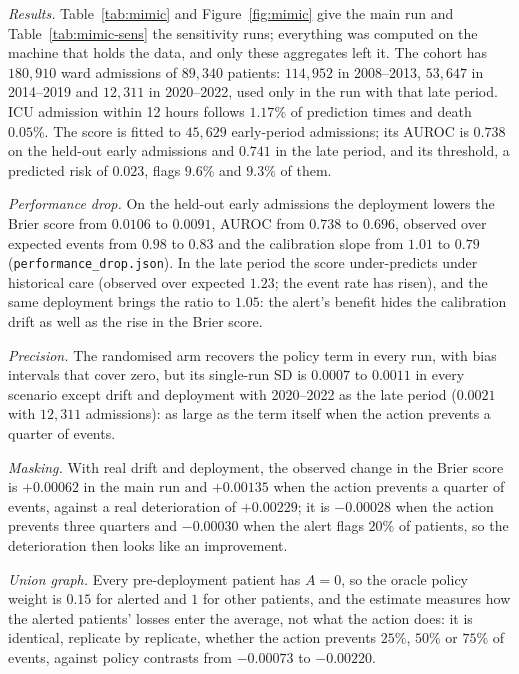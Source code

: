 \documentclass[letterpaper]{article} %
\begin{document}
\emph{Results.} Table~\ref{tab:mimic} and Figure~\ref{fig:mimic} give the
main run and Table~\ref{tab:mimic-sens} the sensitivity runs; everything was
computed on the machine that holds the data, and only these aggregates left
it. The cohort has $180{,}910$ ward admissions of $89{,}340$ patients:
$114{,}952$ in 2008--2013, $53{,}647$ in 2014--2019 and $12{,}311$ in
2020--2022, used only in the run with that late period. ICU admission within
12 hours follows $1.17\%$ of prediction times and death $0.05\%$. The score is
fitted to $45{,}629$ early-period admissions; its AUROC is $0.738$ on the
held-out early admissions and $0.741$ in the late period, and its threshold, a
predicted risk of $0.023$, flags $9.6\%$ and $9.3\%$ of them.

\emph{Performance drop.} On the held-out early admissions the deployment
lowers the Brier score from $0.0106$ to $0.0091$, AUROC from $0.738$ to
$0.696$, observed over expected events from $0.98$ to $0.83$ and the
calibration slope from $1.01$ to $0.79$ (\texttt{performance\_drop.json}). In
the late period the score under-predicts under historical care (observed over
expected $1.23$; the event rate has risen), and the same deployment brings the
ratio to $1.05$: the alert's benefit hides the calibration drift as well as
the rise in the Brier score.

\emph{Precision.} The randomised arm recovers the policy term in every run,
with bias intervals that cover zero, but its single-run SD is $0.0007$ to
$0.0011$ in every scenario except drift and deployment with 2020--2022 as the
late period ($0.0021$ with $12{,}311$ admissions): as large as the term itself
when the action prevents a quarter of events.

\emph{Masking.} With real drift and deployment, the observed change in the
Brier score is $+0.00062$ in the main run and $+0.00135$ when the action
prevents a quarter of events, against a real deterioration of $+0.00229$; it
is $-0.00028$ when the action prevents three quarters and $-0.00030$ when the
alert flags $20\%$ of patients, so the deterioration then looks like an
improvement.

\emph{Union graph.} Every pre-deployment patient has $A = 0$, so the oracle
policy weight is $0.15$ for alerted and $1$ for other patients, and the
estimate measures how the alerted patients' losses enter the average, not what
the action does: it is identical, replicate by replicate, whether the action
prevents $25\%$, $50\%$ or $75\%$ of events, against policy contrasts from
$-0.00073$ to $-0.00220$.
\end{document}
